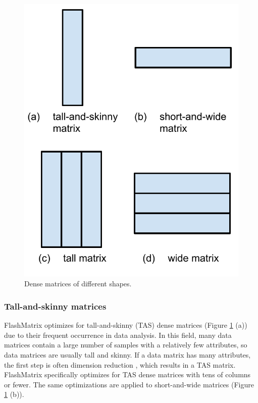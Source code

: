 \begin{figure}
	\centering
	\includegraphics[scale=0.5]{FlashMatrix_figs/matrix.pdf}
	\caption{Dense matrices of different shapes.}
	\label{fig:mat}
\end{figure}


\subsubsection{Tall-and-skinny matrices} \label{sec:tas_mat}

FlashMatrix optimizes for tall-and-skinny (TAS) dense matrices (Figure
\ref{fig:mat} (a)) due to their
frequent occurrence in data analysis. In this field, many data matrices contain
a large number of samples with a relatively few attributes, so 
data matrices are usually tall and skinny. If a data matrix has many
attributes, the first step is often dimension reduction \cite{Jain00}, which
results in a TAS matrix. FlashMatrix specifically optimizes for TAS dense
matrices with tens of columns or fewer. The same optimizations are applied
to short-and-wide matrices (Figure \ref{fig:mat} (b)).

